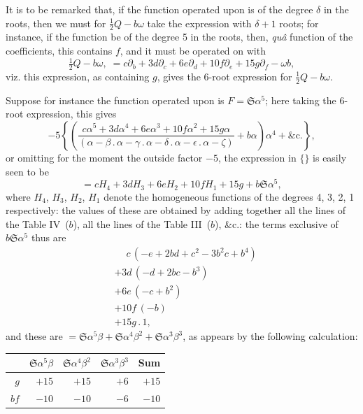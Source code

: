 \documentclass[11pt,a4paper]{book}
\begin{document}
\setcounter{art}{29}
\begin{art}
It is to be remarked that, if the function operated upon is of the degree $\delta$ in the roots, then we must for $\frac{1}{2}Q - b\omega$ take the expression with $\delta + 1$ roots; for instance, if the function be of the degree 5 in the roots, then, \textit{qu\^{a}} function of the coefficients, this contains $f$, and it must be operated on with
\[
\tfrac{1}{2}Q - b\omega,\; = c\partial_{b} + 3d\partial_{c} + 6e\partial_{d} + 10f\partial_{e} + 15g\partial_{f} - \omega b,
\]
viz. this expression, as containing $g$, gives the 6-root expression for $\frac{1}{2}Q - b\omega$.
\end{art}

\setcounter{art}{30}
\begin{art}
Suppose for instance the function operated upon is $F = \mathfrak{S}\alpha^{5}$; here taking the 6-root expression, this gives
\[
-5\left\{\left(\frac{c\alpha^{5} + 3d\alpha^{4} + 6e\alpha^{3} + 10f\alpha^{2} + 15g\alpha}{(\alpha - \beta\,.\,\alpha - \gamma\,.\,\alpha - \delta\,.\,\alpha - \epsilon\,.\,\alpha - \zeta)} + b\alpha\right)\alpha^{4} + \&\mathrm{c}.\right\},
\]
or omitting for the moment the outside factor $-5$, the expression in $\{\}$ is easily seen to be
\[
= cH_{4} + 3dH_{3} + 6eH_{2} + 10fH_{1} + 15g + b\mathfrak{S}\alpha^{5},
\]
where $H_{4}$, $H_{3}$, $H_{2}$, $H_{1}$ denote the homogeneous functions of the degrees 4, 3, 2, 1 respectively: the values of these are obtained by adding together all the lines of the Table IV~($b$), all the lines of the Table III~($b$), \&c.: the terms exclusive of $b\mathfrak{S}\alpha^{5}$ thus are
\begin{align*}
&\phantom{+}c\,(-e + 2bd + c^{2} - 3b^{2}c + b^{4})\\
&+ 3d\,(-d + 2bc - b^{3})\\
&+ 6e\,(-c + b^{2})\\
&+ 10f\,(-b)\\
&+ 15g\,.\,1,
\end{align*}
and these are $= \mathfrak{S}\alpha^{5}\beta + \mathfrak{S}\alpha^{4}\beta^{2} + \mathfrak{S}\alpha^{3}\beta^{3}$, as appears by the following calculation:
\begin{center}
\begin{tabular}{r|rrr|r}
 & $\mathfrak{S}\alpha^{5}\beta$ & $\mathfrak{S}\alpha^{4}\beta^{2}$ & $\mathfrak{S}\alpha^{3}\beta^{3}$ & Sum \\
\hline
$g$ & $+15$ & $+15$ & $+6$ & $+15$ \\
$bf$ & $-10$ & $-10$ & $-6$ & $-10$ \\

\end{tabular}
\end{center}
\end{art}
\end{document}
